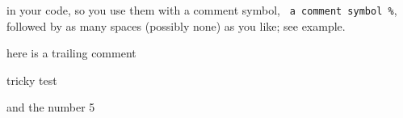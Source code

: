 in your code, so you use them with a comment symbol, \lstinline! a comment symbol %!, followed
by as many spaces (possibly none) as you like; see
example.

here is a trailing comment %

tricky test %

and the number 5
